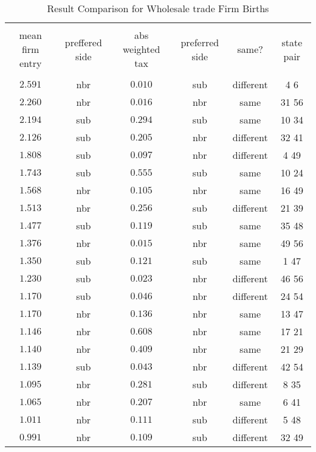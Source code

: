 
\begin{table}[!htbp] \centering 
  \caption{Result Comparison for Wholesale trade Firm Births} 
  \label{} 
\small 
\begin{tabular}{@{\extracolsep{5pt}} cccccc} 
\\[-1.8ex]\hline 
\hline \\[-1.8ex] 
mean firm entry & preffered side & abs weighted tax & preferred side & same? & state pair \\ 
\hline \\[-1.8ex] 
$2.591$ & nbr & $0.010$ & sub & different & 4 6  \\ 
$2.260$ & nbr & $0.016$ & nbr & same & 31 56  \\ 
$2.194$ & sub & $0.294$ & sub & same & 10 34  \\ 
$2.126$ & sub & $0.205$ & nbr & different & 32 41  \\ 
$1.808$ & sub & $0.097$ & nbr & different & 4 49  \\ 
$1.743$ & sub & $0.555$ & sub & same & 10 24  \\ 
$1.568$ & nbr & $0.105$ & nbr & same & 16 49  \\ 
$1.513$ & nbr & $0.256$ & sub & different & 21 39  \\ 
$1.477$ & sub & $0.119$ & sub & same & 35 48  \\ 
$1.376$ & nbr & $0.015$ & nbr & same & 49 56  \\ 
$1.350$ & sub & $0.121$ & sub & same & 1 47  \\ 
$1.230$ & sub & $0.023$ & nbr & different & 46 56  \\ 
$1.170$ & sub & $0.046$ & nbr & different & 24 54  \\ 
$1.170$ & nbr & $0.136$ & nbr & same & 13 47  \\ 
$1.146$ & nbr & $0.608$ & nbr & same & 17 21  \\ 
$1.140$ & nbr & $0.409$ & nbr & same & 21 29  \\ 
$1.139$ & sub & $0.043$ & nbr & different & 42 54  \\ 
$1.095$ & nbr & $0.281$ & sub & different & 8 35  \\ 
$1.065$ & nbr & $0.207$ & nbr & same & 6 41  \\ 
$1.011$ & nbr & $0.111$ & sub & different & 5 48  \\ 
$0.991$ & nbr & $0.109$ & sub & different & 32 49  \\ 

\end{tabular}
\end{table}
